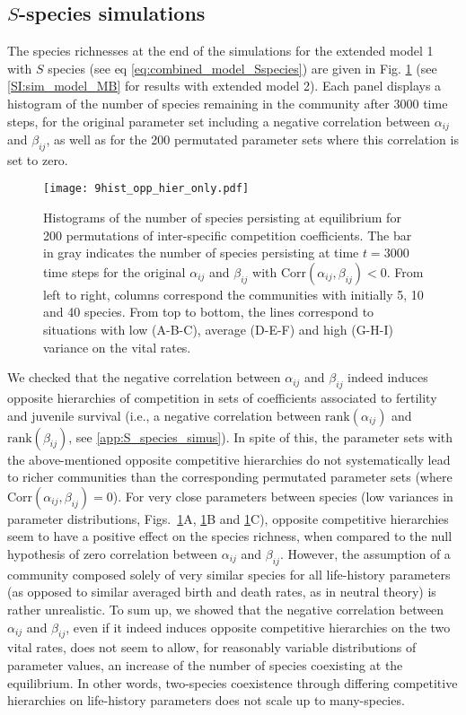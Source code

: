 \documentclass{article}
\begin{document}
\subsection{$S$-species simulations}

The species richnesses at the end of the simulations for the extended model 1 with $S$ species (see eq \ref{eq:combined_model_Sspecies}) are given in Fig. \ref{fig:hist_opp_hier_only} (see \ref{SI:sim_model_MB} for results with extended model 2). Each panel displays a histogram of the number of species remaining in the community after 3000 time steps, for the original parameter set including a negative correlation between $\alpha_{ij}$ and $\beta_{ij}$, as well as for the 200 permutated parameter sets where this correlation is set to zero.

\begin{figure}[H]
    \centering
    \texttt{[image: 9hist\_opp\_hier\_only.pdf]}
    \caption{Histograms of the number of species persisting at equilibrium for 200 permutations of inter-specific competition coefficients. The bar in gray indicates the number of species persisting at time $t=3000$ time steps for the original $\alpha_{ij}$ and $\beta_{ij}$ with $\text{Corr}(\alpha_{ij}, \beta_{ij})<0$. From left to right, columns correspond the communities with initially 5, 10 and 40 species. From top to bottom, the lines correspond to situations with low (A-B-C), average (D-E-F) and high (G-H-I) variance on the vital rates.}
    \label{fig:hist_opp_hier_only}
\end{figure}

We checked that the negative correlation between $\alpha_{ij}$ and $\beta_{ij}$ indeed induces opposite hierarchies of competition in sets of coefficients associated to fertility and juvenile survival (i.e., a negative correlation between $\text{rank}(\alpha_{ij})$ and $\text{rank}(\beta_{ij})$, see \ref{app:S_species_simus}).
In spite of this, the parameter sets with the above-mentioned opposite competitive hierarchies do not systematically lead to richer communities than the corresponding permutated parameter sets (where $\text{Corr}(\alpha_{ij}, \beta_{ij})=0$).
For very close parameters between species (low variances in parameter distributions, Figs.~\ref{fig:hist_opp_hier_only}A, \ref{fig:hist_opp_hier_only}B and \ref{fig:hist_opp_hier_only}C), opposite competitive hierarchies seem to have a positive effect on the species richness, when compared to the null hypothesis of zero correlation between $\alpha_{ij}$ and $\beta_{ij}$. However, the assumption of a community composed solely of very similar species for all life-history parameters (as opposed to similar averaged birth and death rates, as in neutral theory) is rather unrealistic.
To sum up, we showed that the negative correlation between $\alpha_{ij}$ and $\beta_{ij}$, even if it indeed induces opposite competitive hierarchies on the two vital rates, does not seem to allow, for reasonably variable distributions of parameter values, an increase of the number of species coexisting at the equilibrium. In other words, two-species coexistence through differing competitive hierarchies on life-history parameters does not scale up to many-species. 
\end{document}
